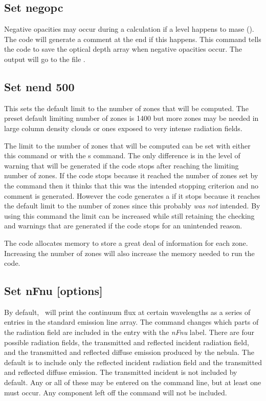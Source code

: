 \subsection{Set negopc}

Negative opacities may occur during a calculation if a level happens
to mase (\citealp{Ferland1993}).
The code will generate a comment at the end if
this happens.
This command tells the code to save the optical depth array
when negative opacities occur.
The output will go to the file
.

\subsection{Set nend 500}

This sets the default limit to the number of zones that will be computed.
The preset default limiting number of zones is 1400 but more zones may be
needed in large column density clouds or ones exposed to very intense
radiation fields.

The limit to the number of zones that will be computed can be set with
either this command or with the s command.
The only difference
is in the level of warning that will be generated if the code stops after
reaching the limiting number of zones.
If the code stops because it reached
the number of zones set by the  command
then it thinks that this
was the intended stopping criterion and no comment is generated.
However
the code generates a  if it stops because
it reaches the default
limit to the number of zones since this probably \emph{was not} intended.  By using
this command the limit can be increased while still retaining the checking
and warnings that are generated if the code stops for an unintended reason.

The code allocates memory to store a great deal of information for each
zone.
Increasing the number of zones will also increase the memory needed
to run the code.

\subsection{Set nFnu [options]}
\label{sec:set:nfnu}

By default, \Cloudy\ will print
the continuum flux at certain wavelengths as a series of entries in the
standard emission line array.
The  command changes which parts of the
radiation field  are included in the entry
with the \emph{nFnu} label.
There are four possible radiation fields, the transmitted
and reflected incident radiation field,
and the transmitted and reflected diffuse
emission produced by the nebula.
The default is to include only the 
reflected incident radiation field
and the transmitted and reflected diffuse
emission.  The transmitted incident is not included by default.
Any or all of these may be entered on the command line, but at least one must occur.
Any component left off the command will not be included.

